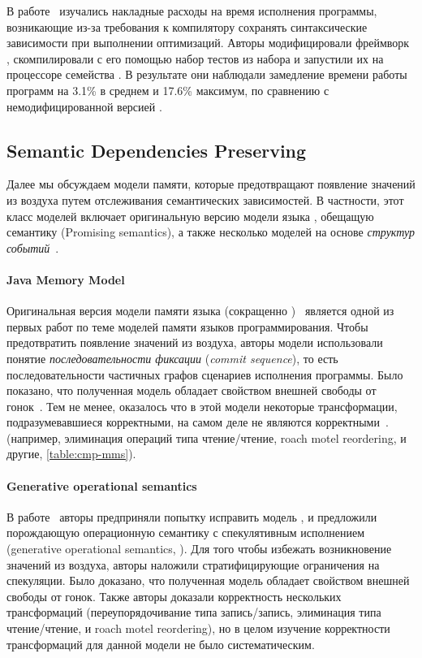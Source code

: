 В работе~\cite{Ou-Demsky:OOPSLA18} изучались накладные расходы
на время исполнения программы, возникающие из-за требования 
к компилятору сохранять синтаксические зависимости при выполнении оптимизаций. 
Авторы модифицировали фреймворк \LLVM, скомпилировали с его помощью 
набор тестов из набора \SPECCPU и запустили их на процессоре семейства .
В результате они наблюдали замедление времени работы программ 
на 3.1\% в среднем и 17.6\% максимум, по сравнению с немодифицированной версией \LLVM.  

\subsection{Semantic Dependencies Preserving}
\label{sec:catalog:sdeprf}

Далее мы обсуждаем модели памяти, 
которые предотвращают появление значений из воздуха 
путем отслеживания семантических зависимостей. 
В частности, этот класс моделей включает оригинальную 
версию модели языка \Java, обещащую семантику (Promising semantics), 
а также несколько моделей на основе \emph{структур событий}~\cite{Winskel:86}. 

\paragraph{Java Memory Model}
\label{sec:catalog:jmm}

Оригинальная версия модели памяти языка \Java (сокращенно \JMM)~\cite{Manson-al:POPL05}
является одной из первых работ по теме моделей памяти языков программирования.
Чтобы предотвратить появление значений из воздуха, 
авторы модели использовали понятие 
\emph{последовательности фиксации} (\emph{commit sequence}), 
то есть последовательности частичных графов сценариев исполнения программы. 
Было показано, что полученная модель обладает 
свойством внешней свободы от гонок~\cite{Huisman-Petri:CONCUR07}.
Тем не менее, оказалось что в этой модели
некоторые трансформации, подразумевавшиеся корректными, 
на самом деле не являются корректными~\cite{Sevcik-Aspinall:ECOOP08}.
(например, элиминация операций типа чтение/чтение, 
roach motel reordering, и другие, \see \cref{table:cmp-mms}). 

\paragraph{Generative operational semantics}

В работе~\cite{Jagadeesan-al:ESOP10} авторы предприняли попытку исправить модель \JMM,
и предложили порождающую операционную семантику с спекулятивным исполнением
(generative operational semantics, \GOS).
Для того чтобы избежать возникновение значений из воздуха, 
авторы наложили стратифицирующие ограничения на спекуляции. 
Было доказано, что полученная модель обладает свойством 
внешней свободы от гонок. 
Также авторы доказали корректность нескольких трансформаций
(переупорядочивание типа запись/запись, 
элиминация типа чтение/чтение, и roach motel reordering), 
но в целом изучение корректности трансформаций для данной модели не было систематическим. 

